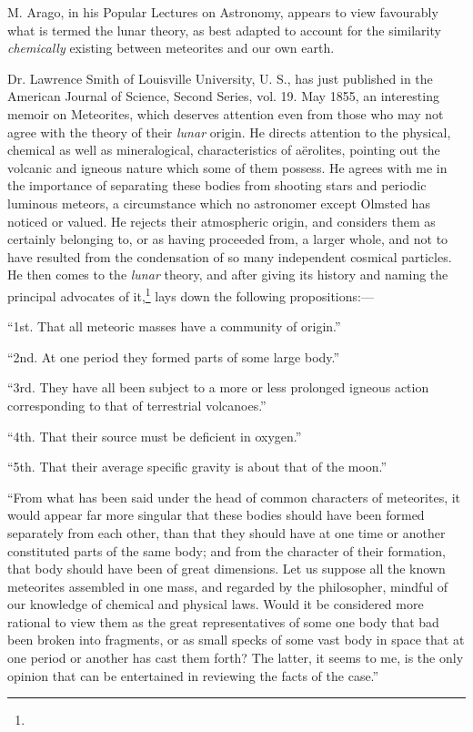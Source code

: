 \documentclass[a4paper, 12pt, oneside]{article}
\begin{document}
M. Arago, in his Popular Lectures on Astronomy, appears to view favourably what is termed the lunar theory, as best adapted to account for the similarity \emph{chemically} existing between meteorites and our own earth.

Dr. Lawrence Smith of Louisville University, U. S., has just published in the American Journal of Science, Second Series, vol. 19. May 1855, an interesting memoir on Meteorites, which deserves attention even from those who may not agree with the theory of their \emph{lunar} origin. He directs attention to the physical, chemical as well as mineralogical, characteristics of aërolites, pointing out the volcanic and igneous nature which some of them possess. He agrees with me in the importance of separating these bodies from shooting stars and periodic luminous meteors, a circumstance which no astronomer except Olmsted has noticed or valued. He rejects their atmospheric origin, and considers them as certainly belonging to, or as having proceeded from, a larger whole, and not to have resulted from the condensation of so many independent cosmical particles. He then comes to the \emph{lunar} theory, and after giving its history and naming the principal advocates of it,\footnote{} lays down the following propositions:---

``1st. That all meteoric masses have a community of origin.''

``2nd. At one period they formed parts of some large body.''

``3rd. They have all been subject to a more or less prolonged igneous action corresponding to that of terrestrial volcanoes.''

``4th. That their source must be deficient in oxygen.''

``5th. That their average specific gravity is about that of the moon.''

``From what has been said under the head of common characters of meteorites, it would appear far more singular that these bodies should have been formed separately from each other, than that they should have at one time or another constituted parts of the same body; and from the character of their formation, that body should have been of great dimensions. Let us suppose all the known meteorites assembled in one mass, and regarded by the philosopher, mindful of our knowledge of chemical and physical laws. Would it be considered more rational to view them as the great representatives of some one body that bad been broken into fragments, or as small specks of some vast body in space that at one period or another has cast them forth? The latter, it seems to me, is the only opinion that can be entertained in reviewing the facts of the case.''
\end{document}
